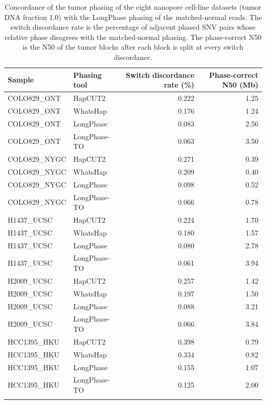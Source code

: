 \documentclass[pdflatex,sn-nature]{sn-jnl}
\begin{document}
\begin{table}[htbp]
  \centering
  \caption[Phasing concordance with the matched normal]%
  {Concordance of the tumor phasing of the eight nanopore cell-line datasets (tumor DNA fraction 1.0) with the LongPhase phasing of the matched-normal reads. The switch discordance rate is the percentage of adjacent phased SNV pairs whose relative phase disagrees with the matched-normal phasing. The phase-correct N50 is the N50 of the tumor blocks after each block is split at every switch discordance.}
  \label{tab:phase-concordance}
  \begin{tabular}{@{}llrr@{}}
    \toprule
    Sample & Phasing tool & Switch discordance rate (\%) & Phase-correct N50 (Mb) \\
    \midrule
    COLO829\_ONT & HapCUT2 & 0.222 & 1.25 \\
    COLO829\_ONT & WhatsHap & 0.176 & 1.24 \\
    COLO829\_ONT & LongPhase & 0.083 & 2.56 \\
    COLO829\_ONT & LongPhase-TO & 0.063 & 3.50 \\
    \addlinespace
    COLO829\_NYGC & HapCUT2 & 0.271 & 0.39 \\
    COLO829\_NYGC & WhatsHap & 0.209 & 0.40 \\
    COLO829\_NYGC & LongPhase & 0.098 & 0.52 \\
    COLO829\_NYGC & LongPhase-TO & 0.066 & 0.78 \\
    \addlinespace
    H1437\_UCSC & HapCUT2 & 0.224 & 1.70 \\
    H1437\_UCSC & WhatsHap & 0.180 & 1.57 \\
    H1437\_UCSC & LongPhase & 0.080 & 2.78 \\
    H1437\_UCSC & LongPhase-TO & 0.061 & 3.94 \\
    \addlinespace
    H2009\_UCSC & HapCUT2 & 0.257 & 1.42 \\
    H2009\_UCSC & WhatsHap & 0.197 & 1.50 \\
    H2009\_UCSC & LongPhase & 0.088 & 3.21 \\
    H2009\_UCSC & LongPhase-TO & 0.066 & 3.84 \\
    \addlinespace
    HCC1395\_HKU & HapCUT2 & 0.398 & 0.79 \\
    HCC1395\_HKU & WhatsHap & 0.334 & 0.82 \\
    HCC1395\_HKU & LongPhase & 0.155 & 1.07 \\
    HCC1395\_HKU & LongPhase-TO & 0.125 & 2.00 \\
    \addlinespace

\end{tabular}
\end{table}
\end{document}
